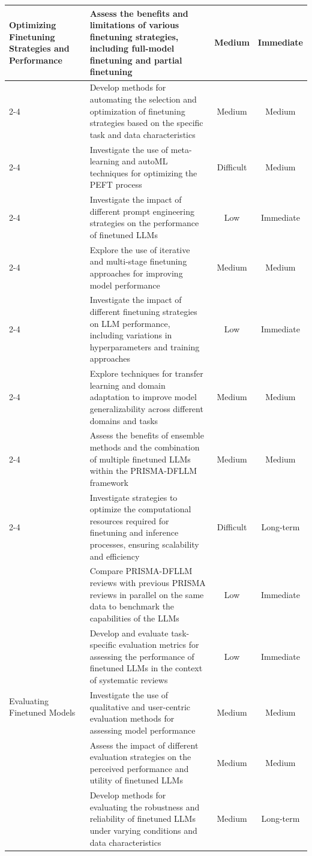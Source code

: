 \documentclass{article}
\begin{document}
{\begin{longtable}[htbp]{p{2.5cm} p{9cm} c c }
\multirow{9}{2.5cm}{\centering Optimizing Finetuning Strategies and Performance}
& Assess the benefits and limitations of various finetuning strategies, including full-model finetuning and partial finetuning & Medium & Immediate \\ \cline{2-4}
& Develop methods for automating the selection and optimization of finetuning strategies based on the specific task and data characteristics & Medium & Medium \\ \cline{2-4}
& Investigate the use of meta-learning and autoML techniques for optimizing the PEFT process & Difficult & Medium \\ \cline{2-4}
& Investigate the impact of different prompt engineering strategies on the performance of finetuned LLMs & Low & Immediate \\ \cline{2-4}
& Explore the use of iterative and multi-stage finetuning approaches for improving model performance & Medium & Medium \\ \cline{2-4}
& Investigate the impact of different finetuning strategies on LLM performance, including variations in hyperparameters and training approaches & Low & Immediate \\ \cline{2-4}
& Explore techniques for transfer learning and domain adaptation to improve model generalizability across different domains and tasks & Medium & Medium \\ \cline{2-4}
& Assess the benefits of ensemble methods and the combination of multiple finetuned LLMs within the PRISMA-DFLLM framework & Medium & Medium \\ \cline{2-4}
& Investigate strategies to optimize the computational resources required for finetuning and inference processes, ensuring scalability and efficiency & Difficult & Long-term \\ \hline


\multirow{5}{2.5cm}{\centering Evaluating Finetuned Models}
& Compare PRISMA-DFLLM reviews with previous PRISMA reviews in parallel on the same data to benchmark the capabilities of the LLMs  & Low & Immediate \\ \cline{2-4}
& Develop and evaluate task-specific evaluation metrics for assessing the performance of finetuned LLMs in the context of systematic reviews & Low & Immediate \\ \cline{2-4}
& Investigate the use of qualitative and user-centric evaluation methods for assessing model performance & Medium & Medium \\ \cline{2-4}
& Assess the impact of different evaluation strategies on the perceived performance and utility of finetuned LLMs & Medium & Medium \\ \cline{2-4}
& Develop methods for evaluating the robustness and reliability of finetuned LLMs under varying conditions and data characteristics & Medium & Long-term \\ \hline


\end{longtable}}
\end{document}
